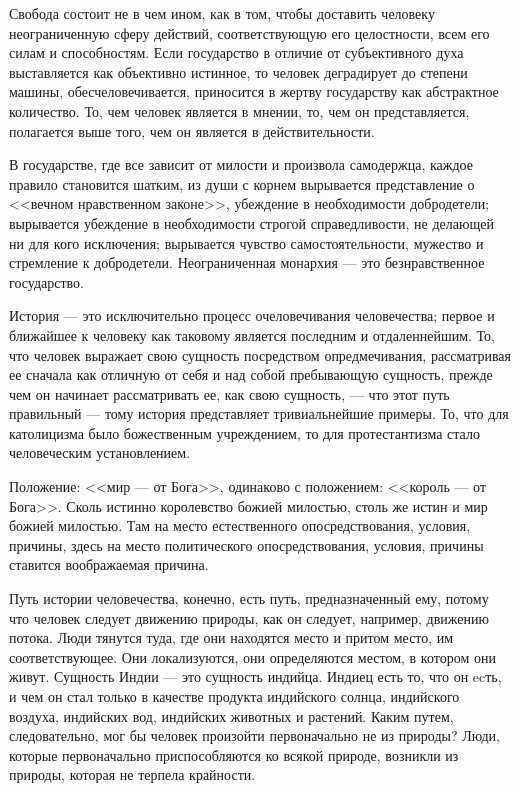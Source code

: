 \documentclass[12pt]{article}
\begin{document}
\bigskip

Свобода состоит не в чем ином, как в том, чтобы доставить человеку неограниченную сферу действий, соответствующую его целостности, всем его силам и способностям. Если государство в отличие от субъективного духа выставляется как объективно истинное, то человек деградирует до степени машины, обесчеловечивается, приносится в жертву государству как абстрактное количество. То, чем человек является в мнении, то, чем он представляется, полагается выше того, чем он является в действительности.

\bigskip

В государстве, где все зависит от милости и произвола самодержца, каждое правило становится шатким, из души с корнем вырывается представление о <<вечном нравственном законе>>, убеждение в необходимости добродетели; вырывается убеждение в необходимости строгой справедливости, не делающей ни для кого исключения; вырывается чувство самостоятельности, мужество и стремление к добродетели. Неограниченная монархия --- это безнравственное государство.

\bigskip

История --- это исключительно процесс очеловечивания человечества; первое и ближайшее к человеку как таковому является последним и отдаленнейшим. То, что человек выражает свою сущность посредством опредмечивания, рассматривая ее сначала как отличную от себя и над собой пребывающую сущность, прежде чем он начинает рассматривать ее, как свою сущность, --- что этот путь правильный --- тому история представляет тривиальнейшие примеры. То, что для католицизма было божественным учреждением, то для протестантизма стало человеческим установлением.

\bigskip

Положение: <<мир --- от Бога>>, одинаково с положением: <<король --- от Бога>>. Сколь истинно королевство божией милостью, столь же истин и мир божией милостью. Там на место естественного опосредствования, условия, причины, здесь на место политического опосредствования, условия, причины ставится воображаемая причина.

\bigskip

Путь истории человечества, конечно, есть путь, предназначенный ему, потому что человек следует движению природы, как он следует, например, движению потока. Люди тянутся туда, где они находятся место и притом место, им соответствующее. Они локализуются, они определяются местом, в котором они живут. Сущность Индии --- это сущность индийца. Индиец есть то, что он ecть, и чем он стал только в качестве продукта индийского солнца, индийского воздуха, индийских вод, индийских животных и растений. Каким путем, следовательно, мог бы человек произойти первоначально не из природы? Люди, которые первоначально приспособляются ко всякой природе, возникли из природы, которая не терпела крайности.
\end{document}
